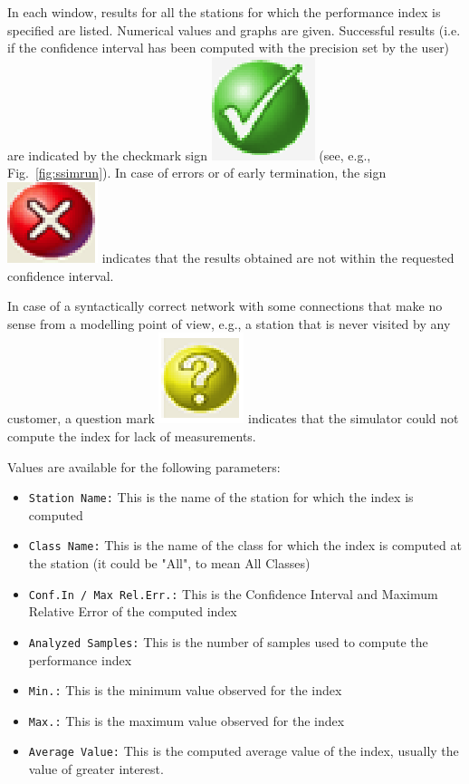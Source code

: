 In each window, results for all the stations for which the
performance index is specified are listed. Numerical values and
graphs are given. Successful results (i.e. if the confidence
interval has been computed with the precision set by the user) are
indicated by the checkmark sign \includegraphics[scale=.3]
{img/jsimg/tick} (see, e.g.,
Fig.~\ref{fig:ssimrun}). In case of errors or of early
termination, the sign \includegraphics[scale=.3]
{img/jsimg/cross2} indicates that the
results obtained are not within the requested confidence interval.

In case of a syntactically correct network with some connections
that make no sense from a modelling point of view, e.g., a station
that is never visited by any customer, a question mark \includegraphics[scale=.3]{img/jsimg/question}
indicates that the simulator could not
compute the index for lack of measurements.

Values are available for the following parameters:
\begin{itemize}

\item \texttt{Station Name:} This is the name of the station for
which the index is computed \item \texttt{Class Name:} This is the
name of the class for which the index is computed at the station
(it could be "All", to mean All Classes) \item \texttt{Conf.In /
Max Rel.Err.:} This is the Confidence Interval and Maximum
Relative Error of the computed index \item \texttt{Analyzed
Samples:} This is the number of samples used to compute the
performance index \item  \texttt{Min.:} This is the minimum value
observed for the index \item \texttt{Max.:} This is the maximum
value observed for the index \item \texttt{Average Value:} This is
the computed average value of the index, usually the value of
greater interest.
\end{itemize}

